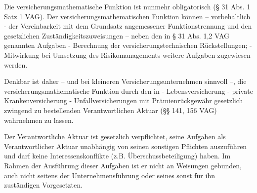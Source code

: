 Die versicherungsmathematische Funktion ist nunmehr obligatorisch (§ 31
Abs. 1 Satz 1 VAG). Der versicherungsmathematischen Funktion können – 
vorbehaltlich - der Vereinbarkeit mit dem Grundsatz angemessener Funktionstrennung
und den gesetzlichen Zuständigkeitszuweisungen – neben den in § 31 Abs. 1,2 VAG 
genannten Aufgaben 
- Berechnung der versicherungstechnischen Rückstellungen; 
- Mitwirkung bei Umsetzung des Risikomanagements
weitere Aufgaben zugewiesen werden. 

Denkbar ist daher – und bei kleineren Versicherungsunternehmen sinnvoll –, 
die versicherungsmathematische Funktion durch den in 
- Lebensversicherung
- private Krankenversicherung 
- Unfallversicherungen mit Prämienrückgewähr 
gesetzlich zwingend zu bestellenden Verantwortlichen Aktuar (§§ 141, 156 VAG) wahrnehmen zu lassen.

Der Verantwortliche Aktuar ist gesetzlich verpflichtet, seine Aufgaben als Verantwortlicher
Aktuar unabhängig von seinen sonstigen Pflichten auszuführen und darf keine Interessenskonflikte (z.B. Überschussbeteiligung) haben. 
Im Rahmen der Ausführung dieser Aufgaben ist er nicht an Weisungen gebunden, auch nicht seitens der
Unternehmensführung oder seines sonst für ihn zuständigen Vorgesetzten.
